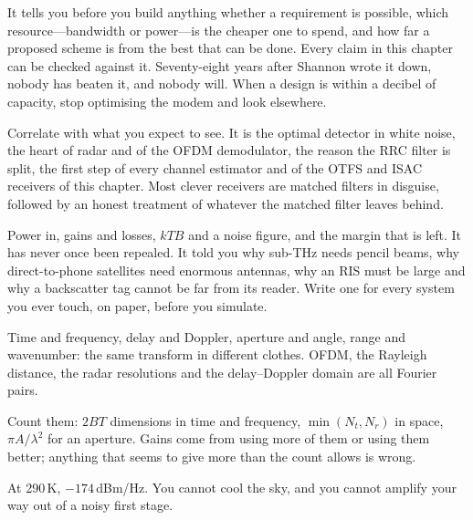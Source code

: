 \begin{description}[style=nextline,leftmargin=1.2em,font=\sffamily\bfseries\small\color{navy}]
\item[Shannon's capacity, $C=B\log_2(1+\mathrm{SNR})$.] It tells you before you build anything whether a
requirement is possible, which resource---bandwidth or power---is the cheaper one to spend, and how
far a proposed scheme is from the best that can be done. Every claim in this chapter can be checked
against it. Seventy-eight years after Shannon wrote it down, nobody has beaten it, and nobody will.
When a design is within a decibel of capacity, stop optimising the modem and look elsewhere.
\item[The matched filter and the sufficient statistic.] Correlate with what you expect to see. It is
the optimal detector in white noise, the heart of radar and of the OFDM demodulator, the reason the
RRC filter is split, the first step of every channel estimator and of the OTFS and ISAC receivers of
this chapter. Most clever receivers are matched filters in disguise, followed by an honest treatment
of whatever the matched filter leaves behind.
\item[The link budget.] Power in, gains and losses, $kTB$ and a noise figure, and the margin that is
left. It has never once been repealed. It told you why sub-THz needs pencil beams, why direct-to-phone
satellites need enormous antennas, why an RIS must be large and why a backscatter tag cannot be far
from its reader. Write one for every system you ever touch, on paper, before you simulate.
\item[Fourier.] Time and frequency, delay and Doppler, aperture and angle, range and wavenumber: the
same transform in different clothes. OFDM, the Rayleigh distance, the radar resolutions and the
delay--Doppler domain are all Fourier pairs.
\item[Degrees of freedom.] Count them: $2BT$ dimensions in time and frequency, $\min(N_t,N_r)$ in
space, $\pi A/\lambda^2$ for an aperture. Gains come from using more of them or using them better;
anything that seems to give more than the count allows is wrong.
\item[Noise is the floor, and it is $kT$.] At 290\,K, $-174$\,dBm/Hz. You cannot cool the sky, and you
cannot amplify your way out of a noisy first stage.
\end{description}


